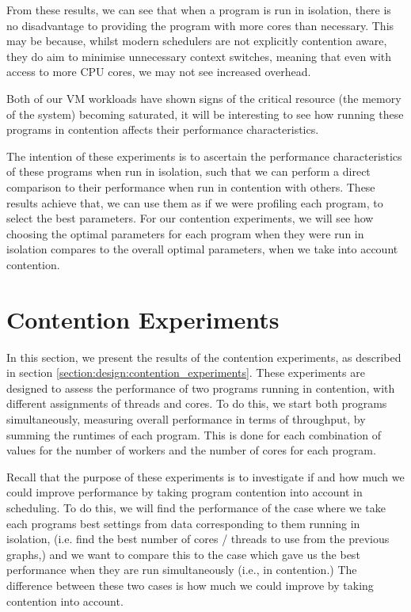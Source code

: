 From these results, we can see that when a program is run in isolation, there is no disadvantage to providing the program with more cores than necessary. This may be because, whilst modern schedulers are not explicitly contention aware, they do aim to minimise unnecessary context switches, meaning that even with access to more CPU cores, we may not see increased overhead.

Both of our VM workloads have shown signs of the critical resource (the memory of the system) becoming saturated, it will be interesting to see how running these programs in contention affects their performance characteristics.

The intention of these experiments is to ascertain the performance characteristics of these programs when run in isolation, such that we can perform a direct comparison to their performance when run in contention with others. These results achieve that, we can use them as if we were profiling each program, to select the best parameters. For our contention experiments, we will see how choosing the optimal parameters for each program when they were run in isolation compares to the overall optimal parameters, when we take into account contention.



\section{Contention Experiments}
\label{section:results:contention_experiments}

In this section, we present the results of the contention experiments, as described in section \ref{section:design:contention_experiments}. These experiments are designed to assess the performance of two programs running in contention, with different assignments of threads and cores. To do this, we start both programs simultaneously, measuring overall performance in terms of throughput, by summing the runtimes of each program. This is done for each combination of values for the number of workers and the number of cores for each program.

Recall that the purpose of these experiments is to investigate if and how much we could improve performance by taking program contention into account in scheduling. To do this, we will find the performance of the case where we take each programs best settings from data corresponding to them running in isolation, (i.e. find the best number of cores / threads to use from the previous graphs,) and we want to compare this to the case which gave us the best performance when they are run simultaneously (i.e., in contention.) The difference between these two cases is how much we could improve by taking contention into account.

